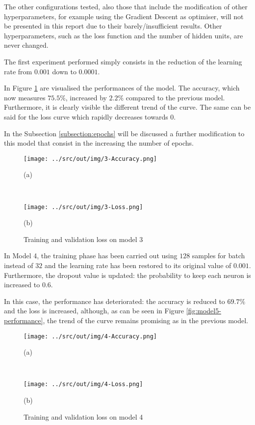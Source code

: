 \documentclass[a4paper,12pt]{article} %
\begin{document}
	The other configurations tested, also those that include the modification 
	of other hyperparameters, for example using the Gradient Descent as 
	optimiser, will not be presented in this report due to their 
	barely/insufficient results. Other hyperparameters, such as the loss 
	function and the number of hidden units, are never changed. 
	\newline

	The first experiment performed simply consists in the reduction of the 
	learning rate from $0.001$ down to $0.0001$. 
	
	In Figure \ref{fig:model3-performance} are visualised the performances of 
	the model. The accuracy, which now measures $75.5\%$, increased by $2.2\%$ 
	compared to the previous model. Furthermore, it is clearly visible the 
	different trend of the curve. 
	The same can be said for the loss curve which rapidly decreases towards $0$.
	
	In the Subsection \ref{subsection:epochs} will be discussed a further 
	modification to this model that consist in the increasing the number 
	of epochs.

	\begin{figure}[htb]
		\begin{minipage}[c]{.49\textwidth}
			\centering
			\texttt{[image: ../src/out/img/3-Accuracy.png]}
			\caption*{(a)}
		\end{minipage}
		~
		\begin{minipage}[c]{.49\textwidth}
			\centering
			\texttt{[image: ../src/out/img/3-Loss.png]}
			\caption*{(b)}
		\end{minipage}
		\caption{Training and validation loss on model 3}
		\label{fig:model3-performance}
	\end{figure}
	
	In Model 4, the training phase has been carried out using $128$ samples 
	for batch instead of $32$ and the learning rate has been restored to its 
	original value of $0.001$. 
	Furthermore, the dropout value is updated: the probability to keep each 
	neuron is increased to $0.6$. 
	
	In this case, the performance has deteriorated: the accuracy is reduced to 
	$69.7\%$ and the loss is increased, although, as can be seen in Figure 
	\ref*{fig:model5-performance}, the trend of the curve remains promising as 
	in the previous model.
	
	\begin{figure}[htb]
		\begin{minipage}[c]{.49\textwidth}
			\centering
			\texttt{[image: ../src/out/img/4-Accuracy.png]}
			\caption*{(a)}
		\end{minipage}
		~
		\begin{minipage}[c]{.49\textwidth}
			\centering
			\texttt{[image: ../src/out/img/4-Loss.png]}
			\caption*{(b)}
		\end{minipage}
		\caption{Training and validation loss on model 4}
		\label{fig:model4-performance}
	\end{figure}
	
\end{document}
